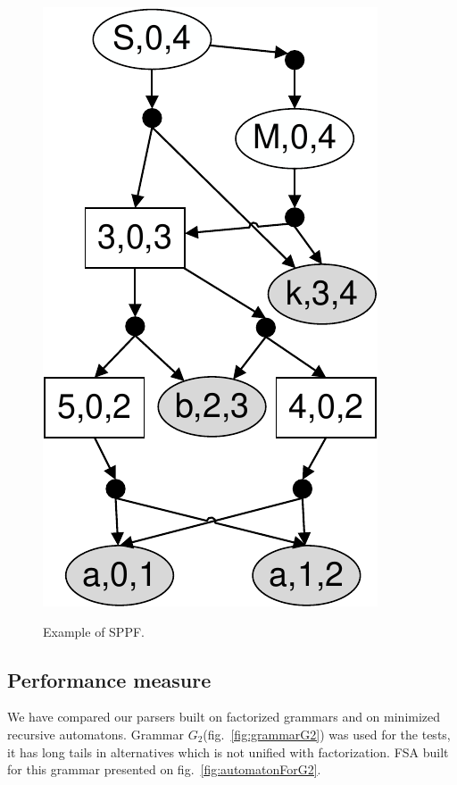 \documentclass[runningheads,a4paper]{llncs}
\begin{document}
\begin{figure}[H]
{        \includegraphics[scale=.5]{pictures/G1SPPF.pdf}
        \label{fig:SPPFForG1}
    }
    \caption{Example of SPPF.}
\end{figure}


\subsection{Performance measure}

We have compared our parsers built on factorized grammars and on minimized recursive automatons.
Grammar $G_2$(fig.~\ref{fig:grammarG2}) was used for the tests,
it has long tails in alternatives which is not unified with factorization.
FSA built for this grammar presented on fig.~\ref{fig:automatonForG2}.
\end{document}
